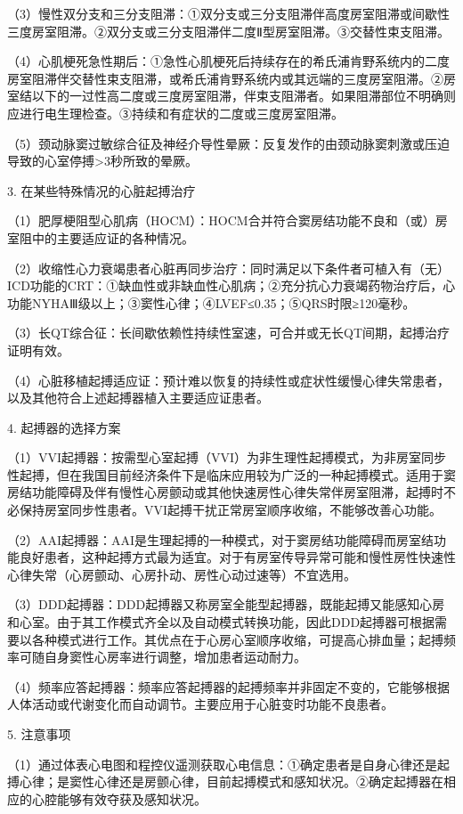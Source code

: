 （3）慢性双分支和三分支阻滞：①双分支或三分支阻滞伴高度房室阻滞或间歇性三度房室阻滞。②双分支或三分支阻滞伴二度Ⅱ型房室阻滞。③交替性束支阻滞。

（4）心肌梗死急性期后：①急性心肌梗死后持续存在的希氏浦肯野系统内的二度房室阻滞伴交替性束支阻滞，或希氏浦肯野系统内或其远端的三度房室阻滞。②房室结以下的一过性高二度或三度房室阻滞，伴束支阻滞者。如果阻滞部位不明确则应进行电生理检查。③持续和有症状的二度或三度房室阻滞。

（5）颈动脉窦过敏综合征及神经介导性晕厥：反复发作的由颈动脉窦刺激或压迫导致的心室停搏\textgreater{}3秒所致的晕厥。

3. 在某些特殊情况的心脏起搏治疗

（1）肥厚梗阻型心肌病（HOCM）：HOCM合并符合窦房结功能不良和（或）房室阻中的主要适应证的各种情况。

（2）收缩性心力衰竭患者心脏再同步治疗：同时满足以下条件者可植入有（无）ICD功能的CRT：①缺血性或非缺血性心肌病；②充分抗心力衰竭药物治疗后，心功能NYHAⅢ级以上；③窦性心律；④LVEF≤0.35；⑤QRS时限≥120毫秒。

（3）长QT综合征：长间歇依赖性持续性室速，可合并或无长QT间期，起搏治疗证明有效。

（4）心脏移植起搏适应证：预计难以恢复的持续性或症状性缓慢心律失常患者，以及其他符合上述起搏器植入主要适应证患者。

4. 起搏器的选择方案

（1）VVI起搏器：按需型心室起搏（VVI）为非生理性起搏模式，为非房室同步性起搏，但在我国目前经济条件下是临床应用较为广泛的一种起搏模式。适用于窦房结功能障碍及伴有慢性心房颤动或其他快速房性心律失常伴房室阻滞，起搏时不必保持房室同步性患者。VVI起搏干扰正常房室顺序收缩，不能够改善心功能。

（2）AAI起搏器：AAI是生理起搏的一种模式，对于窦房结功能障碍而房室结功能良好患者，这种起搏方式最为适宜。对于有房室传导异常可能和慢性房性快速性心律失常（心房颤动、心房扑动、房性心动过速等）不宜选用。

（3）DDD起搏器：DDD起搏器又称房室全能型起搏器，既能起搏又能感知心房和心室。由于其工作模式齐全以及自动模式转换功能，因此DDD起搏器可根据需要以各种模式进行工作。其优点在于心房心室顺序收缩，可提高心排血量；起搏频率可随自身窦性心房率进行调整，增加患者运动耐力。

（4）频率应答起搏器：频率应答起搏器的起搏频率并非固定不变的，它能够根据人体活动或代谢变化而自动调节。主要应用于心脏变时功能不良患者。

5. 注意事项

（1）通过体表心电图和程控仪遥测获取心电信息：①确定患者是自身心律还是起搏心律；是窦性心律还是房颤心律，目前起搏模式和感知状况。②确定起搏器在相应的心腔能够有效夺获及感知状况。

